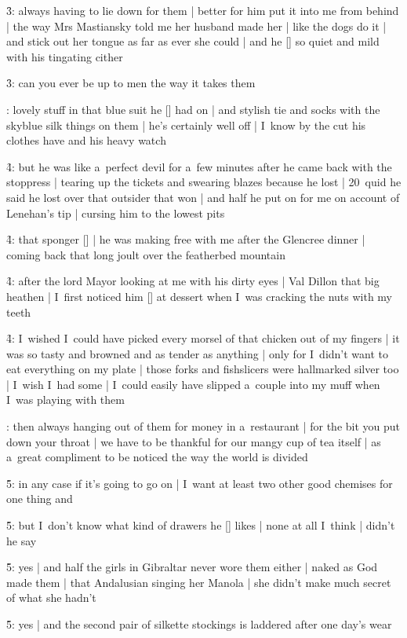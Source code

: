 \f3:
always having to lie down for them |
better for him put it into me from behind |
the way Mrs Mastiansky told me her husband made her |
like the dogs do it |
and stick out her tongue as far as ever she could |
and he [\mastiansky] so quiet and mild with his tingating cither

\f3:
can you ever be up to men the way it takes them

:
lovely stuff in that blue suit he [\boylan] had on |
and stylish tie and socks with the skyblue silk things on them |
he's certainly well off |
I~know by the cut his clothes have and his heavy watch

\f4:
but he was like a~perfect devil for a~few minutes after he came back with the stoppress |
tearing up the tickets and swearing blazes because he lost |
20~quid he said he lost over that outsider that won |
and half he put on for me on account of Lenehan's tip |
cursing him to the lowest pits

\f4:
that sponger [\lenehan] |
he was making free with me after the Glencree dinner |
coming back that long joult over the featherbed mountain

\f4:
after the lord Mayor looking at me with his dirty eyes |
Val Dillon that big heathen |
I~first noticed him [\valdillon] at dessert
when I~was cracking the nuts with my teeth

\f4:
I~wished I~could have picked every morsel of that chicken out of my fingers |
it was so tasty and browned and as tender as anything |
only for I~didn't want to eat everything on my plate |
those forks and fishslicers were hallmarked silver too |
I~wish I~had some |
I~could easily have slipped a~couple into my muff when I~was playing with them

:
then always hanging out of them for money in a~restaurant |
for the bit you put down your throat |
we have to be thankful for our mangy cup of tea itself |
as a~great compliment to be noticed the way the world is divided

\f5:
in any case if it's going to go on |
I~want at least two other good chemises for one thing and

\f5:
but I~don't know what kind of drawers he [\boylan] likes |
none at all I~think |
didn't he say

\f5:
yes |
and half the girls in Gibraltar never wore them either |
naked as God made them |
that Andalusian singing her Manola |
she didn't make much secret of what she hadn't

\f5:
yes |
and the second pair of silkette stockings is laddered after one day's wear

